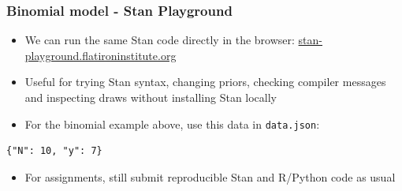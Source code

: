 \documentclass[10pt]{beamer}
\begin{document}
\begin{frame}[fragile]

\frametitle{Binomial model - Stan Playground}

  \begin{itemize}
  \item We can run the same Stan code directly in the browser:
    \href{https://stan-playground.flatironinstitute.org/}{stan-playground.flatironinstitute.org}
  \item Useful for trying Stan syntax, changing priors, checking compiler
    messages and inspecting draws without installing Stan locally
  \item For the binomial example above, use this data in \texttt{data.json}:
  \end{itemize}

  {\small
  \begin{lstlisting}[basicstyle=\ttfamily]
{"N": 10, "y": 7}
\end{lstlisting}}

  \begin{itemize}
  \item For assignments, still submit reproducible Stan and R/Python code
    as usual
  \end{itemize}

\end{frame}






\end{document}

